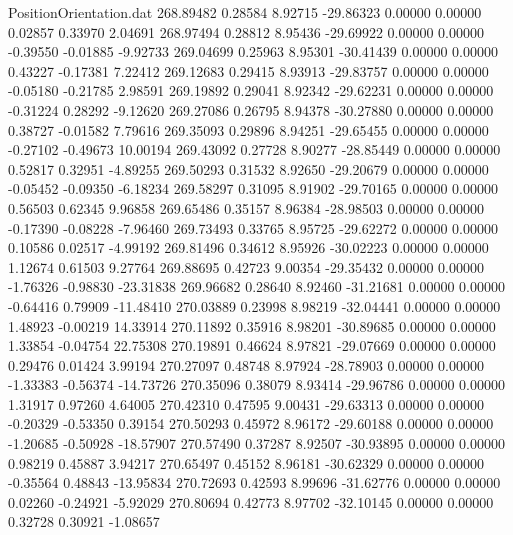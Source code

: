 \begin{filecontents}{PositionOrientation.dat}
 268.89482    0.28584    8.92715   -29.86323    0.00000    0.00000    0.02857    0.33970    2.04691
 268.97494    0.28812    8.95436   -29.69922    0.00000    0.00000   -0.39550   -0.01885   -9.92733
 269.04699    0.25963    8.95301   -30.41439    0.00000    0.00000    0.43227   -0.17381    7.22412
 269.12683    0.29415    8.93913   -29.83757    0.00000    0.00000   -0.05180   -0.21785    2.98591
 269.19892    0.29041    8.92342   -29.62231    0.00000    0.00000   -0.31224    0.28292   -9.12620
 269.27086    0.26795    8.94378   -30.27880    0.00000    0.00000    0.38727   -0.01582    7.79616
 269.35093    0.29896    8.94251   -29.65455    0.00000    0.00000   -0.27102   -0.49673   10.00194
 269.43092    0.27728    8.90277   -28.85449    0.00000    0.00000    0.52817    0.32951   -4.89255
 269.50293    0.31532    8.92650   -29.20679    0.00000    0.00000   -0.05452   -0.09350   -6.18234
 269.58297    0.31095    8.91902   -29.70165    0.00000    0.00000    0.56503    0.62345    9.96858
 269.65486    0.35157    8.96384   -28.98503    0.00000    0.00000   -0.17390   -0.08228   -7.96460
 269.73493    0.33765    8.95725   -29.62272    0.00000    0.00000    0.10586    0.02517   -4.99192
 269.81496    0.34612    8.95926   -30.02223    0.00000    0.00000    1.12674    0.61503    9.27764
 269.88695    0.42723    9.00354   -29.35432    0.00000    0.00000   -1.76326   -0.98830  -23.31838
 269.96682    0.28640    8.92460   -31.21681    0.00000    0.00000   -0.64416    0.79909  -11.48410
 270.03889    0.23998    8.98219   -32.04441    0.00000    0.00000    1.48923   -0.00219   14.33914
 270.11892    0.35916    8.98201   -30.89685    0.00000    0.00000    1.33854   -0.04754   22.75308
 270.19891    0.46624    8.97821   -29.07669    0.00000    0.00000    0.29476    0.01424    3.99194
 270.27097    0.48748    8.97924   -28.78903    0.00000    0.00000   -1.33383   -0.56374  -14.73726
 270.35096    0.38079    8.93414   -29.96786    0.00000    0.00000    1.31917    0.97260    4.64005
 270.42310    0.47595    9.00431   -29.63313    0.00000    0.00000   -0.20329   -0.53350    0.39154
 270.50293    0.45972    8.96172   -29.60188    0.00000    0.00000   -1.20685   -0.50928  -18.57907
 270.57490    0.37287    8.92507   -30.93895    0.00000    0.00000    0.98219    0.45887    3.94217
 270.65497    0.45152    8.96181   -30.62329    0.00000    0.00000   -0.35564    0.48843  -13.95834
 270.72693    0.42593    8.99696   -31.62776    0.00000    0.00000    0.02260   -0.24921   -5.92029
 270.80694    0.42773    8.97702   -32.10145    0.00000    0.00000    0.32728    0.30921   -1.08657

\end{filecontents}
